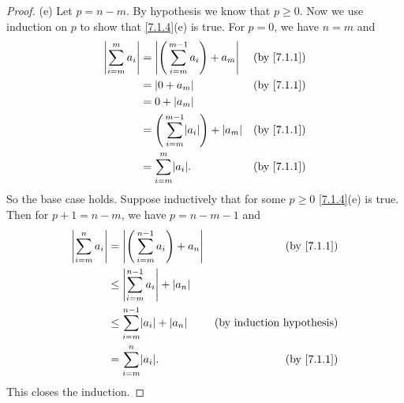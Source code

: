 \begin{proof}{(e)}
  Let \(p = n - m\).
  By hypothesis we know that \(p \geq 0\).
  Now we use induction on \(p\) to show that \cref{7.1.4}(e) is true.
  For \(p = 0\), we have \(n = m\) and
  \begin{align*}
    \abs{\sum_{i = m}^m a_i} & = \abs{\Bigg(\sum_{i = m}^{m - 1} a_i\Bigg) + a_m}       & \text{(by \cref{7.1.1})} \\
                             & = \abs{0 + a_m}                                          & \text{(by \cref{7.1.1})} \\
                             & = 0 + \abs{a_m}                                                                     \\
                             & = \Bigg(\sum_{i = m}^{m - 1} \abs{a_i}\Bigg) + \abs{a_m} & \text{(by \cref{7.1.1})} \\
                             & = \sum_{i = m}^m \abs{a_i}.                              & \text{(by \cref{7.1.1})}
  \end{align*}
  So the base case holds.
  Suppose inductively that for some \(p \geq 0\) \cref{7.1.4}(e) is true.
  Then for \(p + 1 = n - m\), we have \(p = n - m - 1\) and
  \begin{align*}
    \abs{\sum_{i = m}^n a_i} & = \abs{\Bigg(\sum_{i = m}^{n - 1} a_i\Bigg) + a_n} & \text{(by \cref{7.1.1})}         \\
                             & \leq \abs{\sum_{i = m}^{n - 1} a_i} + \abs{a_n}                                       \\
                             & \leq \sum_{i = m}^{n - 1} \abs{a_i} + \abs{a_n}    & \text{(by induction hypothesis)} \\
                             & = \sum_{i = m}^n \abs{a_i}.                        & \text{(by \cref{7.1.1})}
  \end{align*}
  This closes the induction.
\end{proof}

